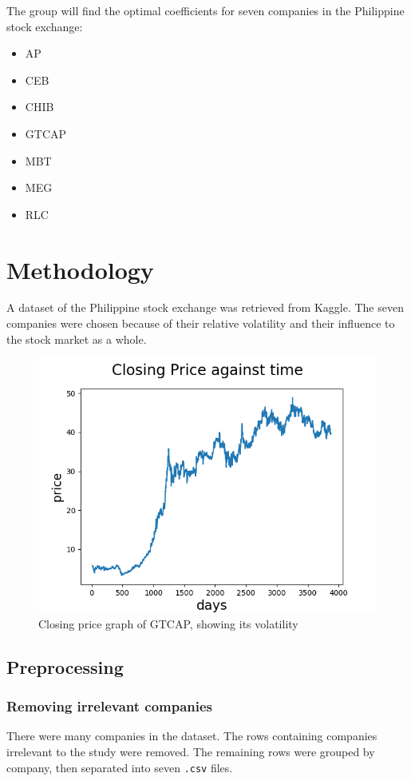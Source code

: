 \documentclass[8pt]{article}
\begin{document}
	The group will find the optimal coefficients for seven companies in the Philippine stock exchange:
	\begin{itemize}
		\item AP
		\item CEB
		\item CHIB
		\item GTCAP
		\item MBT
		\item MEG
		\item RLC
	\end{itemize}

	\section{Methodology}

	A dataset of the Philippine stock exchange was retrieved from Kaggle.
	The seven companies were chosen because of their relative volatility and their influence to the stock market as a whole.

	\begin{figure}[h]
		\centering
		\includegraphics{ap_closing_price.png}
		\caption{Closing price graph of GTCAP, showing its volatility}
		\label{fig:gtcap_graph}
	\end{figure}

	\subsection{Preprocessing}
		\subsubsection{Removing irrelevant companies}
		There were many companies in the dataset. The rows containing companies irrelevant to the study were removed.
		The remaining rows were grouped by company, then separated into seven \texttt{.csv} files.
\end{document}
